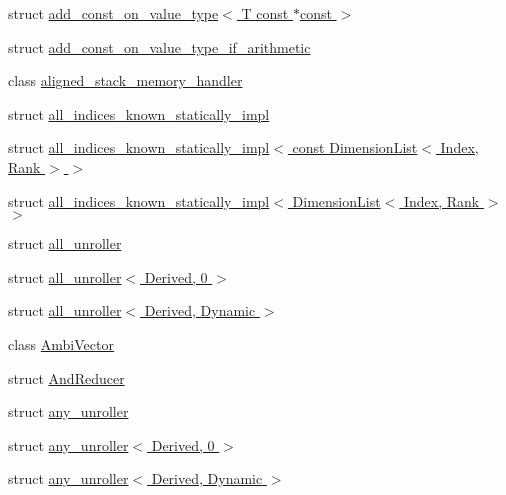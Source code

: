 \begin{DoxyCompactItemize}
\item 
struct \hyperlink{struct_eigen_1_1internal_1_1add__const__on__value__type_3_01_t_01const_01_5const_01_4}{add\+\_\+const\+\_\+on\+\_\+value\+\_\+type$<$ T const $\ast$const $>$}
\item 
struct \hyperlink{struct_eigen_1_1internal_1_1add__const__on__value__type__if__arithmetic}{add\+\_\+const\+\_\+on\+\_\+value\+\_\+type\+\_\+if\+\_\+arithmetic}
\item 
class \hyperlink{class_eigen_1_1internal_1_1aligned__stack__memory__handler}{aligned\+\_\+stack\+\_\+memory\+\_\+handler}
\item 
struct \hyperlink{struct_eigen_1_1internal_1_1all__indices__known__statically__impl}{all\+\_\+indices\+\_\+known\+\_\+statically\+\_\+impl}
\item 
struct \hyperlink{struct_eigen_1_1internal_1_1all__indices__known__statically__impl_3_01const_01_dimension_list_3_01_index_00_01_rank_01_4_01_4}{all\+\_\+indices\+\_\+known\+\_\+statically\+\_\+impl$<$ const Dimension\+List$<$ Index, Rank $>$ $>$}
\item 
struct \hyperlink{struct_eigen_1_1internal_1_1all__indices__known__statically__impl_3_01_dimension_list_3_01_index_00_01_rank_01_4_01_4}{all\+\_\+indices\+\_\+known\+\_\+statically\+\_\+impl$<$ Dimension\+List$<$ Index, Rank $>$ $>$}
\item 
struct \hyperlink{struct_eigen_1_1internal_1_1all__unroller}{all\+\_\+unroller}
\item 
struct \hyperlink{struct_eigen_1_1internal_1_1all__unroller_3_01_derived_00_010_01_4}{all\+\_\+unroller$<$ Derived, 0 $>$}
\item 
struct \hyperlink{struct_eigen_1_1internal_1_1all__unroller_3_01_derived_00_01_dynamic_01_4}{all\+\_\+unroller$<$ Derived, Dynamic $>$}
\item 
class \hyperlink{class_eigen_1_1internal_1_1_ambi_vector}{Ambi\+Vector}
\item 
struct \hyperlink{struct_eigen_1_1internal_1_1_and_reducer}{And\+Reducer}
\item 
struct \hyperlink{struct_eigen_1_1internal_1_1any__unroller}{any\+\_\+unroller}
\item 
struct \hyperlink{struct_eigen_1_1internal_1_1any__unroller_3_01_derived_00_010_01_4}{any\+\_\+unroller$<$ Derived, 0 $>$}
\item 
struct \hyperlink{struct_eigen_1_1internal_1_1any__unroller_3_01_derived_00_01_dynamic_01_4}{any\+\_\+unroller$<$ Derived, Dynamic $>$}
\item 

\end{DoxyCompactItemize}
